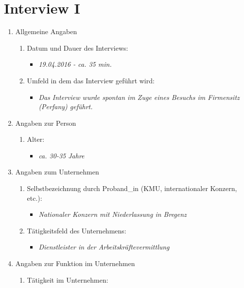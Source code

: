 \documentclass[Bachelorarbeit.tex]{subfiles}
\begin{document}
\section{Interview I}
\label{anhang:interview1}
\begin{enumerate}
	\item Allgemeine Angaben
	\begin{enumerate}
		\item Datum und Dauer des Interviews:
		\begin{itemize}
			\item[] \textit{19.04.2016 - ca. 35 min.}
		\end{itemize}
		\item Umfeld in dem das Interview geführt wird:
		\begin{itemize}
			\item[] \textit{Das Interview wurde spontan im Zuge eines Besuchs im Firmensitz (Perfany) geführt.}
		\end{itemize}
	\end{enumerate}
	\item Angaben zur Person
	\begin{enumerate}
		\item Alter:
		\begin{itemize}
			\item[] \textit{ca. 30-35 Jahre}
		\end{itemize}
	\end{enumerate}
	\item Angaben zum Unternehmen
	\begin{enumerate}
		\item Selbstbezeichnung durch Proband\_in  (\ac{KMU}, internationaler Konzern, etc.):
		\begin{itemize}
			\item[] \textit{Nationaler Konzern mit Niederlassung in Bregenz}
		\end{itemize}
		\item Tätigkeitsfeld des Unternehmens:
		\begin{itemize}
			\item[] \textit{Dienstleister in der Arbeitskräftevermittlung}
		\end{itemize}
	\end{enumerate}
	\item Angaben zur Funktion im Unternehmen
	\begin{enumerate}
		\item Tätigkeit im Unternehmen:
		\begin{itemize}

\end{itemize}
\end{enumerate}
\end{enumerate}
\end{document}
